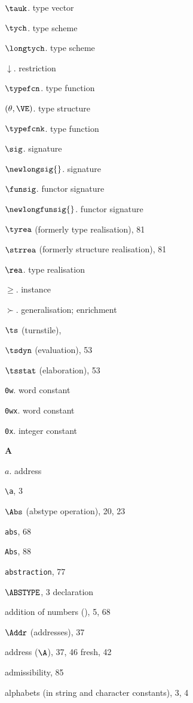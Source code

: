 \begin{theindex}
\item $\tauk$. \see type vector
\item $\tych$. \see type scheme
\item $\longtych$. \see type scheme
\item $\downarrow$. \see restriction
\item $\typefcn$. \see type function
\item $(\theta,\VE)$. \see type structure
\item $\typefcnk$. \see type function
\item $\sig$. \see signature
\item $\newlongsig{}$. \see signature
\item $\funsig$. \see functor signature
\item $\newlongfunsig{}$. \see functor signature
\item $\tyrea$ (formerly type realisation), 81
\item $\strrea$ (formerly structure realisation), 81
\item $\rea$. \see type realisation
\item $\geq$. \see instance
\item $\succ$. \see generalisation; enrichment
\item $\ts$ (turnstile), \tsrefs
\item $\tsdyn$ (evaluation), 53
\item $\tsstat$ (elaboration), 53
\item {\tt 0w}. \see word constant
\item {\tt 0wx}. \see word constant
\item {\tt 0x}. \see integer constant
\indexspace
\parbox{64mm}{\hfil{\large\bf A}\hfil}
\indexspace
\item $a$. \see address
\item \verb+\a+, 3
\item $\Abs$ (abstype operation), 20, 23
\item {\tt abs}, 68
\item {\tt Abs}, 88
\item {\tt abstraction}, 77
\item $\ABSTYPE$, 3
\subitem \seealso declaration
\item addition of numbers (\ml{+}), 5, 68
\item $\Addr$ (addresses), 37
\item address ($\A$), 37, 46
\subitem fresh, 42
\item admissibility, 85
\item alphabets (in string and character constants), 3, 4

\end{theindex}
